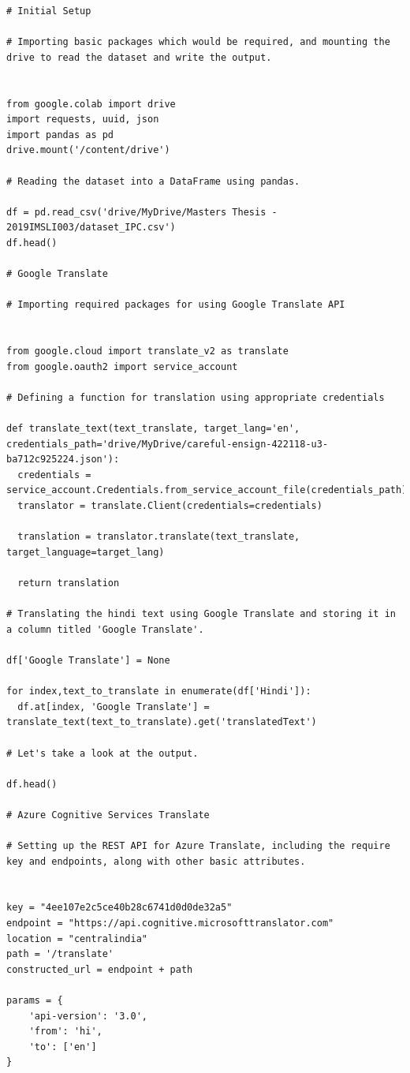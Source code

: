 \singlespacing
\begin{verbatim}
# Initial Setup

# Importing basic packages which would be required, and mounting the drive to read the dataset and write the output.


from google.colab import drive
import requests, uuid, json
import pandas as pd
drive.mount('/content/drive')

# Reading the dataset into a DataFrame using pandas.

df = pd.read_csv('drive/MyDrive/Masters Thesis - 2019IMSLI003/dataset_IPC.csv')
df.head()

# Google Translate

# Importing required packages for using Google Translate API


from google.cloud import translate_v2 as translate
from google.oauth2 import service_account

# Defining a function for translation using appropriate credentials

def translate_text(text_translate, target_lang='en', credentials_path='drive/MyDrive/careful-ensign-422118-u3-ba712c925224.json'):
  credentials = service_account.Credentials.from_service_account_file(credentials_path)
  translator = translate.Client(credentials=credentials)

  translation = translator.translate(text_translate, target_language=target_lang)

  return translation

# Translating the hindi text using Google Translate and storing it in a column titled 'Google Translate'.

df['Google Translate'] = None

for index,text_to_translate in enumerate(df['Hindi']):
  df.at[index, 'Google Translate'] = translate_text(text_to_translate).get('translatedText')

# Let's take a look at the output.

df.head()

# Azure Cognitive Services Translate

# Setting up the REST API for Azure Translate, including the require key and endpoints, along with other basic attributes.


key = "4ee107e2c5ce40b28c6741d0d0de32a5"
endpoint = "https://api.cognitive.microsofttranslator.com"
location = "centralindia"
path = '/translate'
constructed_url = endpoint + path

params = {
    'api-version': '3.0',
    'from': 'hi',
    'to': ['en']
}


\end{verbatim}
